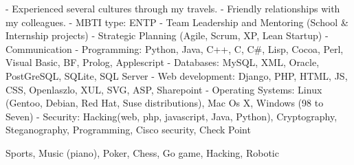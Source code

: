 \documentclass[english]{ecv}
\makeatletter
\renewcommand{\ecvBSec}[2][\ecv@lang]{%
  \ifthenelse{\equal{#1}{\ecv@lang}}{%
    \tabularnewline%
    \ecvLeft{\textsc{\Large{\textcolor{ecv@ColBlue}{#2}}} \medskip } &%
    \tabularnewline%
  }{}%
}
\makeatother
\begin{document}
\begin{ecv}
\ecvBSec{\hypertarget{hypertarget:\ecvAbilities}{\ecvAbilities}}
                { - Experienced several cultures through my travels.\ecvNewLine
                  - Friendly relationships with my colleagues.\ecvNewLine
                  - MBTI type: ENTP\ecvNewLine
                }
                {- Team Leadership and Mentoring (School \& Internship projects)
                 - Strategic Planning (Agile, Scrum, XP, Lean Startup)
                 - Communication
                }
                {- Programming: Python, Java, C++, C, C\#, Lisp, Cocoa, Perl,
                  Visual Basic, BF, Prolog, Applescript\ecvNewLine
                 - Databases: MySQL, XML, Oracle, PostGreSQL, SQLite, SQL
                 Server\ecvNewLine
                 - Web development: Django, PHP, HTML, JS, CSS, Openlaszlo, XUL,
                 SVG, ASP, Sharepoint\ecvNewLine
                 - Operating Systems: Linux (Gentoo, Debian, Red Hat, Suse
                 distributions), Mac Os X, Windows (98 to Seven)\ecvNewLine
                 - Security: Hacking(web, php, javascript, Java, Python),
                 Cryptography, Steganography, Programming, Cisco security, Check Point}

                {Sports, Music (piano), Poker, Chess, Go game, Hacking, Robotic
                }



\end{ecv}

\end{document}
